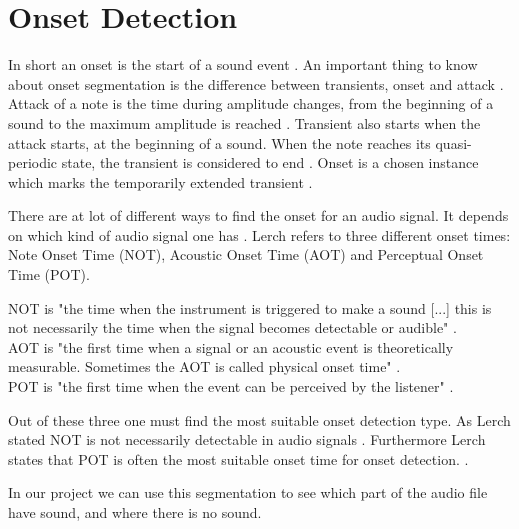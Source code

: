 \section{Onset Detection}
In short an onset is the start of a sound event \citep{ACA}. 
An important thing to know about onset segmentation is the difference between transients, onset and attack \citep{Bello2005}.
Attack of a note is the time during amplitude changes, from the beginning of a sound to the maximum amplitude is reached \citep{ACA}.
Transient also starts when the attack starts, at the beginning of a sound\citep{Bello2005}. When the note reaches its quasi-periodic state, the transient is considered to end \citep{ACA}.
Onset is a chosen instance which marks the temporarily extended transient \citep{Bello2005}. 


There are at lot of different ways to find the onset for an audio signal. It depends on which kind of audio signal one has \citep{Bello2005}. 
Lerch refers to three different onset times: Note Onset Time (NOT), Acoustic Onset Time (AOT) and Perceptual Onset Time (POT).


NOT is "the time when the instrument is triggered to make a sound [...] this is not necessarily the time when the signal becomes detectable or audible" \citep{ACA}.
\\
AOT is "the first time when a signal or an acoustic event is theoretically measurable. Sometimes the AOT is called physical onset time" \citep{ACA}.
\\
POT is "the first time when the event can be perceived by the
listener" \citep{ACA}.


Out of these three one must find the most suitable onset detection type. As Lerch stated NOT is not necessarily detectable in audio signals \cite{ACA}. Furthermore  Lerch states that POT is often the most suitable onset time for onset detection. \citep{ACA}.

In our project we can use this segmentation to see which part of the audio file have sound, and where there is no sound. 	